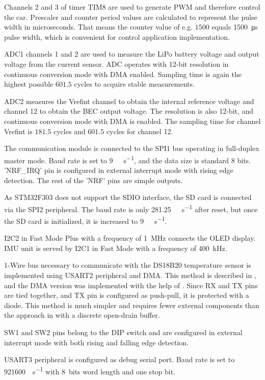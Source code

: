 Channels 2 and 3 of timer TIM8 are used to generate PWM and therefore control the car. Prescaler and counter period values are calculated to represent the pulse width in microseconds. That means the counter value of e.g. $1500$ equals \SI{1500}{\micro\second} pulse width, which is convenient for control application implementation.

ADC1 channels 1 and 2 are used to measure the LiPo battery voltage and output voltage from the current sensor. ADC operates with 12-bit resolution in continuous conversion mode with DMA enabled. Sampling time is again the highest possible $601.5$ cycles to acquire stable measurements.

ADC2 measures the Vrefint channel to obtain the internal reference voltage and channel 12 to obtain the BEC output voltage. The resolution is also 12-bit, and continuous conversion mode with DMA is enabled. The sampling time for channel Vrefint is $181.5$ cycles and $601.5$ cycles for channel 12.

The communication module is connected to the SPI1 bus operating in full-duplex master mode. Baud rate is set to \SI{9}{\mega\bit\per\second}, and the data size is standard 8 bits. 'NRF\_IRQ' pin is configured in external interrupt mode with rising edge detection. The rest of the 'NRF' pins are simple outputs.

As STM32F303 does not support the SDIO interface, the SD card is connected via the SPI2 peripheral. The baud rate is only \SI{281.25}{\kilo\bit\per\second} after reset, but once the SD card is initialized, it is increased to \SI{9}{\mega\bit\per\second}.

I2C2 in Fast Mode Plus with a frequency of \SI{1}{\MHz} connects the OLED display. IMU unit is served by I2C1 in Fast Mode with a frequency of \SI{400}{\kHz}.

1-Wire bus necessary to communicate with the DS18B20 temperature sensor is implemented using USART2 peripheral and DMA. This method is described in \cite{1wire_uart}, and the DMA version was implemented with the help of \cite{1wire_uart_imp}. Since RX and TX pins are tied together, and TX pin is configured as push-pull, it is protected with a diode. This method is much simpler and requires fewer external components than the approach in \cite{1wire_uart} with a discrete open-drain buffer.

SW1 and SW2 pins belong to the DIP switch and are configured in external interrupt mode with both rising and falling edge detection.

USART3 peripheral is configured as debug serial port. Baud rate is set to \SI{921600}{\bit\per\second} with 8~bits word length and one stop bit.

